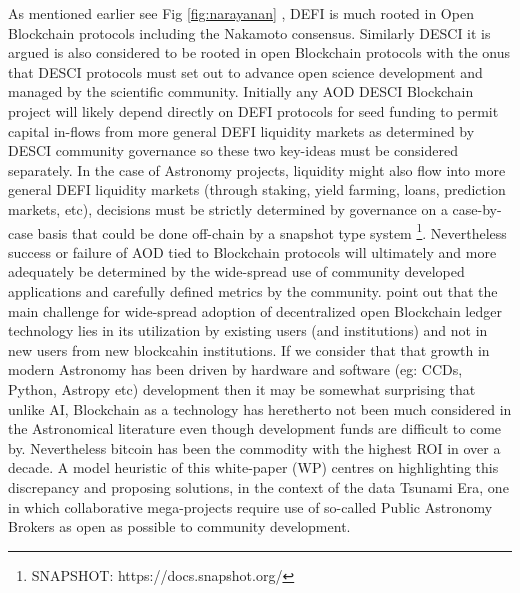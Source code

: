 \documentclass[final,5p,times,twocolumn,authoryear]{elsarticle}
\begin{document}
As mentioned earlier see  Fig \ref{fig:narayanan}
, DEFI is much rooted in Open Blockchain protocols including the Nakamoto consensus. Similarly DESCI it is argued is also considered to be rooted in open Blockchain protocols with the onus that DESCI protocols must set out to advance open science development and managed by the scientific community. Initially any AOD DESCI Blockchain project will likely depend directly on DEFI protocols for seed funding to permit capital in-flows from more general DEFI liquidity markets as determined by DESCI community governance so these two key-ideas must be considered separately. In the case of Astronomy projects, liquidity might also flow into more general DEFI liquidity markets (through staking, yield farming, loans, prediction markets, etc), decisions must be strictly determined by governance on a case-by-case basis that could be done off-chain by a snapshot type system \footnote{SNAPSHOT: https://docs.snapshot.org/}. Nevertheless success or failure of AOD tied to Blockchain protocols will ultimately and more adequately be determined by the wide-spread use of community developed applications and carefully defined metrics by the community. \cite{arvindandclark2017} point out that the main challenge for wide-spread adoption of decentralized open Blockchain ledger technology lies in its utilization by existing users (and institutions) and not in new users from new blockcahin institutions. If we consider that that growth in modern Astronomy has been driven by hardware and software (eg: CCDs, Python, Astropy etc) development then it may be somewhat surprising that unlike AI, Blockchain as a technology has heretherto not been much considered in the Astronomical literature even though development funds are difficult to come by. Nevertheless bitcoin has been the commodity with the highest ROI in over a decade.  A model heuristic of this white-paper (WP) centres on highlighting this discrepancy and proposing solutions, in the context of the data Tsunami Era, one in which collaborative mega-projects require use of so-called Public Astronomy Brokers \cite{bellm19} as open as possible to community development.  
\end{document}
